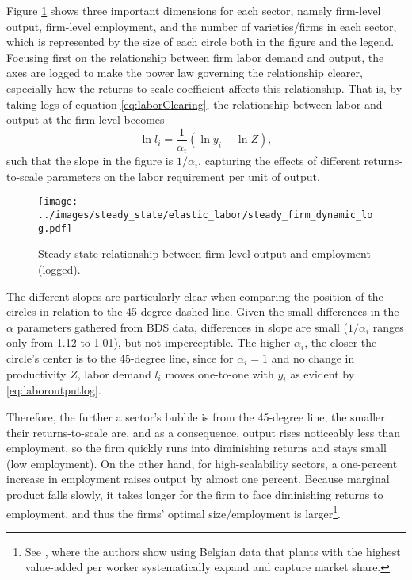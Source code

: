 \documentclass[a4paper,12pt]{article} %
\numberwithin{equation}{section} %
\numberwithin{figure}{section}
\numberwithin{table}{section}
\begin{document}
Figure \ref{fig:steady-output-log} shows three important dimensions for each sector, namely firm-level output, firm-level 
employment, and the number 
of varieties/firms in each sector, which is represented by the size of each circle both in the figure and the legend.
Focusing first on the relationship between firm labor demand and output, the axes are logged to make the power law governing the relationship 
clearer, especially how the returns-to-scale coefficient affects this relationship. That is, by taking logs of equation 
\eqref{eq:laborClearing}, the relationship between labor and output at the firm-level becomes
\begin{equation}
  \ln l_i = \frac{1}{\alpha_i}(\ln y_i - \ln Z), \label{eq:laboroutputlog}
\end{equation}
such that the slope in the figure is $1/\alpha_i$, capturing the effects of different returns-to-scale parameters on the labor requirement
per unit of output. 

\begin{figure}[H]
  \centering
  \texttt{[image: ../images/steady\_state/elastic\_labor/steady\_firm\_dynamic\_log.pdf]}
  \caption{Steady-state relationship between firm-level output and employment (logged).}
  \label{fig:steady-output-log}
\end{figure}

The different slopes are particularly clear when comparing the position of the circles in relation to the 45-degree dashed line. 
Given the small differences in the $\alpha$ parameters gathered from BDS data, differences in slope are small ($1/\alpha_i$ ranges 
only from 1.12 to 1.01), but not imperceptible. The higher $\alpha_i$, the closer the circle's center is to the 45-degree line, since 
for $\alpha_i = 1$ and no change in productivity $Z$, labor demand $l_i$ moves one-to-one with $y_i$ as evident by \eqref{eq:laboroutputlog}.

Therefore, the further a sector's bubble is from the 45-degree line, the smaller their returns-to-scale are, and as a consequence, output
rises noticeably less than employment, so the firm quickly runs into diminishing returns and stays small (low employment). On the other hand, 
for high-scalability sectors, a one-percent increase in employment raises output by almost one percent. Because marginal product falls slowly,
it takes longer for the firm to face diminishing returns to employment, and thus the firms' optimal size/employment is larger\footnote{ See \textcite{baqaee2024darwinian}, where the authors show using Belgian data that 
plants with the highest value-added per worker systematically expand and capture market share.}.
\end{document}
